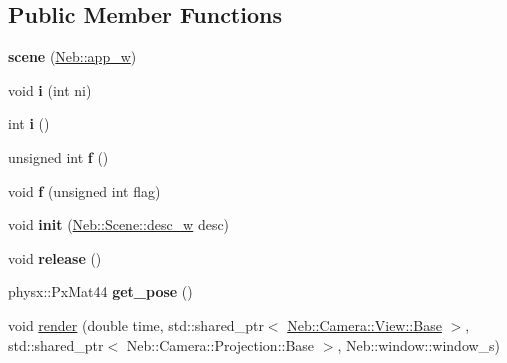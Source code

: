\subsection*{\-Public \-Member \-Functions}
\begin{DoxyCompactItemize}
\item 
\hypertarget{classNeb_1_1Scene_1_1scene_ac355c846bf77b7cfd42d29bb0164ca45}{{\bfseries scene} (\hyperlink{classNeb_1_1weak__ptr}{\-Neb\-::app\-\_\-w})}\label{classNeb_1_1Scene_1_1scene_ac355c846bf77b7cfd42d29bb0164ca45}

\item 
\hypertarget{classNeb_1_1Scene_1_1scene_abe1fa6d1512bfd84e91f9192e7c743ca}{void {\bfseries i} (int ni)}\label{classNeb_1_1Scene_1_1scene_abe1fa6d1512bfd84e91f9192e7c743ca}

\item 
\hypertarget{classNeb_1_1Scene_1_1scene_abbc88704970f055844e5f06453178dcb}{int {\bfseries i} ()}\label{classNeb_1_1Scene_1_1scene_abbc88704970f055844e5f06453178dcb}

\item 
\hypertarget{classNeb_1_1Scene_1_1scene_acb8ef22577d6d70aef89faf02c671d77}{unsigned int {\bfseries f} ()}\label{classNeb_1_1Scene_1_1scene_acb8ef22577d6d70aef89faf02c671d77}

\item 
\hypertarget{classNeb_1_1Scene_1_1scene_a25b3ffec412aa55a88d4c4fb6a1c7a3b}{void {\bfseries f} (unsigned int flag)}\label{classNeb_1_1Scene_1_1scene_a25b3ffec412aa55a88d4c4fb6a1c7a3b}

\item 
\hypertarget{classNeb_1_1Scene_1_1scene_a9e908f1bd9d78e2f2d5c84746c96325f}{void {\bfseries init} (\hyperlink{classNeb_1_1weak__ptr}{\-Neb\-::\-Scene\-::desc\-\_\-w} desc)}\label{classNeb_1_1Scene_1_1scene_a9e908f1bd9d78e2f2d5c84746c96325f}

\item 
\hypertarget{classNeb_1_1Scene_1_1scene_a5de02f6d7763af6ad7b5fb8e57499a65}{void {\bfseries release} ()}\label{classNeb_1_1Scene_1_1scene_a5de02f6d7763af6ad7b5fb8e57499a65}

\item 
\hypertarget{classNeb_1_1Scene_1_1scene_ac14e8f1e177017420a5ef773a42f3b97}{physx\-::\-Px\-Mat44 {\bfseries get\-\_\-pose} ()}\label{classNeb_1_1Scene_1_1scene_ac14e8f1e177017420a5ef773a42f3b97}

\item 
\hypertarget{classNeb_1_1Scene_1_1scene_a93ec5f617a2af11309aec47102bb0b60}{void \hyperlink{classNeb_1_1Scene_1_1scene_a93ec5f617a2af11309aec47102bb0b60}{render} (double time, std\-::shared\-\_\-ptr$<$ \hyperlink{classNeb_1_1Camera_1_1View_1_1Base}{\-Neb\-::\-Camera\-::\-View\-::\-Base} $>$, std\-::shared\-\_\-ptr$<$ \-Neb\-::\-Camera\-::\-Projection\-::\-Base $>$, \-Neb\-::window\-::window\-\_\-s)}\label{classNeb_1_1Scene_1_1scene_a93ec5f617a2af11309aec47102bb0b60}


\end{DoxyCompactItemize}
